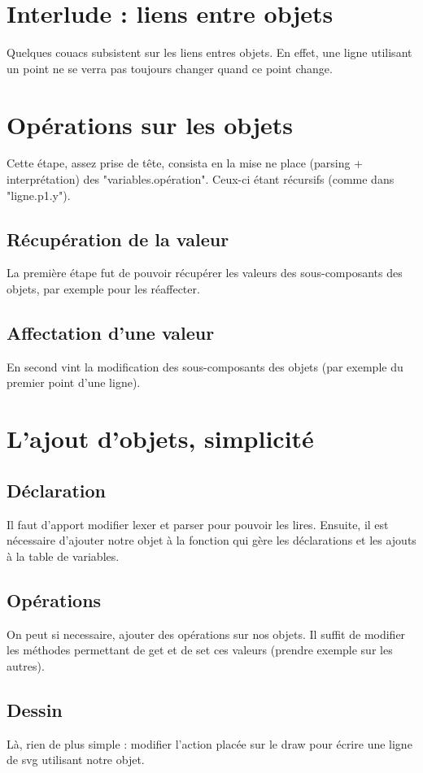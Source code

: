 \documentclass[11pt]{report} %
\begin{document}
\section{Interlude : liens entre objets}
Quelques couacs subsistent sur les liens entres objets. En effet, une ligne utilisant un point ne se verra pas toujours changer quand ce point change.
\section{Opérations sur les objets}
Cette étape, assez prise de tête, consista en la mise ne place (parsing + interprétation) des "variables.opération". Ceux-ci étant récursifs (comme dans "ligne.p1.y").
\subsection{Récupération de la valeur}
La première étape fut de pouvoir récupérer les valeurs des sous-composants des objets, par exemple pour les réaffecter.
\subsection{Affectation d'une valeur}
En second vint la modification des sous-composants des objets (par exemple du premier point d'une ligne).

\section{L'ajout d'objets, simplicité}
\subsection{Déclaration}
Il faut d'apport modifier lexer et parser pour pouvoir les lires. Ensuite, il est nécessaire d'ajouter notre objet à la fonction qui gère les déclarations et les ajouts à la table de variables.
\subsection{Opérations}
On peut si necessaire, ajouter des opérations sur nos objets. Il suffit de modifier les méthodes permettant de get et de set ces valeurs (prendre exemple sur les autres).
\subsection{Dessin}
Là, rien de plus simple : modifier l'action placée sur le draw pour écrire une ligne de svg utilisant notre objet.
\end{document}
